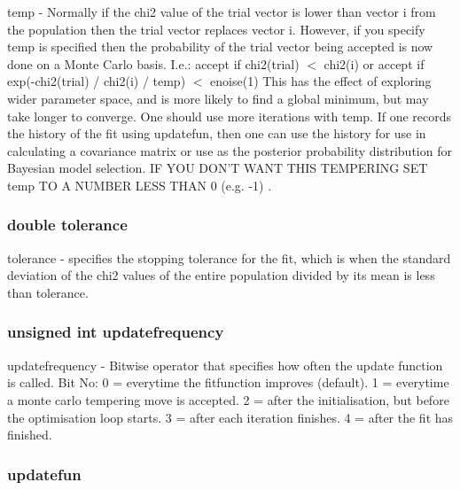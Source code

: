 temp -\/ Normally if the chi2 value of the trial vector is lower than vector i from the population then the trial vector replaces vector i. However, if you specify temp is specified then the probability of the trial vector being accepted is now done on a Monte Carlo basis. I.e.: accept if chi2(trial) $<$ chi2(i) or accept if exp(-\/chi2(trial) / chi2(i) / temp) $<$ enoise(1) This has the effect of exploring wider parameter space, and is more likely to find a global minimum, but may take longer to converge. One should use more iterations with temp. If one records the history of the fit using updatefun, then one can use the history for use in calculating a covariance matrix or use as the posterior probability distribution for Bayesian model selection. IF YOU DON'T WANT THIS TEMPERING SET temp TO A NUMBER LESS THAN 0 (e.g. -\/1) . \hypertarget{structgencurvefit_options_a97eab6d709b80585fe9e8a54b1e3da27}{
\subsubsection[{tolerance}]{\setlength{\rightskip}{0pt plus 5cm}double {\bf tolerance}}}
\label{structgencurvefit_options_a97eab6d709b80585fe9e8a54b1e3da27}
tolerance -\/ specifies the stopping tolerance for the fit, which is when the standard deviation of the chi2 values of the entire population divided by its mean is less than tolerance. \hypertarget{structgencurvefit_options_a44f1fec3d8e41bea598a75b06af1becb}{
\subsubsection[{updatefrequency}]{\setlength{\rightskip}{0pt plus 5cm}unsigned int {\bf updatefrequency}}}
\label{structgencurvefit_options_a44f1fec3d8e41bea598a75b06af1becb}
updatefrequency -\/ Bitwise operator that specifies how often the update function is called. Bit No: 0 = everytime the fitfunction improves (default). 1 = everytime a monte carlo tempering move is accepted. 2 = after the initialisation, but before the optimisation loop starts. 3 = after each iteration finishes. 4 = after the fit has finished. \hypertarget{structgencurvefit_options_ae8dada41d1098787c320af40b0320412}{
\subsubsection[{updatefun}]{ {\bf updatefun}}}
